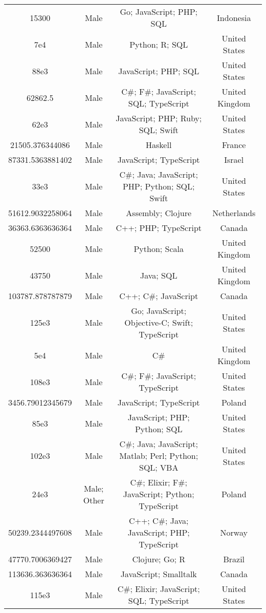 \begin{center}
\begin{tabular}{ |c|c|c|c| }
15300  &  Male  &  Go; JavaScript; PHP; SQL  &  Indonesia  \\ 
7e4  &  Male  &  Python; R; SQL  &  United States  \\ 
88e3  &  Male  &  JavaScript; PHP; SQL  &  United States  \\ 
62862.5  &  Male  &  C\#; F\#; JavaScript; SQL; TypeScript  &  United Kingdom  \\ 
62e3  &  Male  &  JavaScript; PHP; Ruby; SQL; Swift  &  United States  \\ 
21505.376344086  &  Male  &  Haskell  &  France  \\ 
87331.5363881402  &  Male  &  JavaScript; TypeScript  &  Israel  \\ 
33e3  &  Male  &  C\#; Java; JavaScript; PHP; Python; SQL; Swift  &  United States  \\ 
51612.9032258064  &  Male  &  Assembly; Clojure  &  Netherlands  \\ 
36363.6363636364  &  Male  &  C++; PHP; TypeScript  &  Canada  \\ 
52500  &  Male  &  Python; Scala  &  United Kingdom  \\ 
43750  &  Male  &  Java; SQL  &  United Kingdom  \\ 
103787.878787879  &  Male  &  C++; C\#; JavaScript  &  Canada  \\ 
125e3  &  Male  &  Go; JavaScript; Objective-C; Swift; TypeScript  &  United States  \\ 
5e4  &  Male  &  C\#  &  United Kingdom  \\ 
108e3  &  Male  &  C\#; F\#; JavaScript; TypeScript  &  United States  \\ 
3456.79012345679  &  Male  &  JavaScript; TypeScript  &  Poland  \\ 
85e3  &  Male  &  JavaScript; PHP; Python; SQL  &  United States  \\ 
102e3  &  Male  &  C\#; Java; JavaScript; Matlab; Perl; Python; SQL; VBA  &  United States  \\ 
24e3  &  Male; Other  &  C\#; Elixir; F\#; JavaScript; Python; TypeScript  &  Poland  \\ 
50239.2344497608  &  Male  &  C++; C\#; Java; JavaScript; PHP; TypeScript  &  Norway  \\ 
47770.7006369427  &  Male  &  Clojure; Go; R  &  Brazil  \\ 
113636.363636364  &  Male  &  JavaScript; Smalltalk  &  Canada  \\ 
115e3  &  Male  &  C\#; Elixir; JavaScript; SQL; TypeScript  &  United States  \\ 

\end{tabular}
\end{center}
